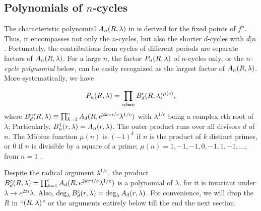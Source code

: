 \documentclass{ws-ijbc}
\begin{document}
\subsection{\label{sec:primfac}Polynomials of $n$-cycles}


The characteristic polynomial $A_n(R, \lambda)$ in 
  is derived for the fixed points of $f^n$.
Thus, it encompasses not only the $n$-cycles,
  but also the shorter $d$-cycles with $d|n$.
%
Fortunately, the contributions from cycles of different periods
  are separate factors of $A_n(R, \lambda)$.
For a large $n$,
  the factor $P_n(R, \lambda)$ of $n$-cycles only,
  or the \emph{$n$-cycle polynomial} below,
  can be easily recognized
  as the largest factor of $A_n(R, \lambda)$.
%
More systematically, we have


  \begin{equation}
    P_n(R, \lambda)
    = \prod_{cd = n} B_d^c(R, \lambda)^{\mu(c)},
  \label{eq:primfac}
  \end{equation}
where
  $B_d^c(R, \lambda) \equiv \prod_{k=1}^c A_{d}(R, e^{2k\pi i/c} \lambda^{1/c})$
  with
  $\lambda^{1/c}$ being a complex $c$th root of $\lambda$;
Particularly, $B_n^1(r, \lambda) = A_n(r, \lambda)$.
The outer product runs over all divisors $d$ of $n$.
%
%
%
The M\"obius function $\mu(n)$ is $(-1)^k$
  if $n$ is the product of $k$ distinct primes,
  or 0 if $n$ is divisible by a square of a prime;
$\mu(n) = 1, -1, -1, 0, -1, 1, -1, \ldots,$
  from $n = 1$
 \cite{hardy}.
%



Despite the radical argument $\lambda^{1/c}$,
  the product
  $B_d^c(R, \lambda) = \prod_{k=1}^c A_d(R, e^{2k\pi i/c} \lambda^{1/c})$
  is a polynomial of $\lambda$,
  for it is invariant under
  $\lambda \rightarrow e^{2\pi i} \lambda$.
Also, $\deg_\lambda B_d^c(r, \lambda) = \deg_\lambda A_d(r, \lambda)$.
For convenience, we will drop the $R$ in ``$(R, \lambda)$'' or the arguments entirely below
  till the end the next section.
%
\end{document}
